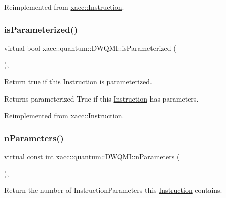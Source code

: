 Reimplemented from \hyperlink{a01657_ad02a1cf7220577124720b7a51424cea7}{xacc\+::\+Instruction}.

\mbox{\label{a01225_aee43b2e499f122dfe250b529a3f77add}} 
\subsubsection{\texorpdfstring{is\+Parameterized()}{isParameterized()}}
{\footnotesize\ttfamily virtual bool xacc\+::quantum\+::\+D\+W\+Q\+M\+I\+::is\+Parameterized (\begin{DoxyParamCaption}{ }\end{DoxyParamCaption})\hspace{0.3cm}{\ttfamily [inline]}, {\ttfamily [virtual]}}

Return true if this \hyperlink{a01657}{Instruction} is parameterized.

\begin{DoxyReturn}{Returns}
parameterized True if this \hyperlink{a01657}{Instruction} has parameters. 
\end{DoxyReturn}


Reimplemented from \hyperlink{a01657_a7b24d8ae485369fc2b2df7a3224a5e26}{xacc\+::\+Instruction}.

\mbox{\label{a01225_afdfc8b852ba29c2b21c5c368098ffc4c}} 
\subsubsection{\texorpdfstring{n\+Parameters()}{nParameters()}}
{\footnotesize\ttfamily virtual const int xacc\+::quantum\+::\+D\+W\+Q\+M\+I\+::n\+Parameters (\begin{DoxyParamCaption}{ }\end{DoxyParamCaption})\hspace{0.3cm}{\ttfamily [inline]}, {\ttfamily [virtual]}}

Return the number of Instruction\+Parameters this \hyperlink{a01657}{Instruction} contains.

